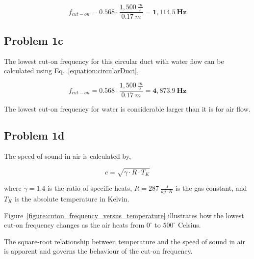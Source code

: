 \vspace{-0.25cm}
\begin{equation*}
    f_{cut-on} = 0.568 \cdot \frac{ 1,500~\frac{m}{s} }{ 0.17~m } = \boldsymbol{1,114.5~Hz}
\end{equation*}




\vspace{-0.25cm}
\subsection*{Problem 1c}

The lowest cut-on frequency for this circular duct with water flow can be calculated using Eq.~\ref{equation:circularDuct},

\vspace{-0.25cm}
\begin{equation*}
    f_{cut-on} = 0.568 \cdot \frac{ 1,500~\frac{m}{s} }{ 0.17~m } = \boldsymbol{4,873.9~Hz}
\end{equation*}

The lowest cut-on frequency for water is considerable larger than it is for air flow.





\vspace{-0.25cm}
\subsection*{Problem 1d}

The speed of sound in air is calculated by,

\vspace{-0.25cm}
\begin{equation}
    c = \sqrt{ \gamma \cdot R \cdot T_K }
    \label{equation:speedOfSoundInAir}
\end{equation}

where $\gamma = 1.4$ is the ratio of specific heats, $R = 287~\frac{J}{kg \cdot K}$ is the gas constant, and $T_K$ is the absolute temperature in Kelvin.

\vspace{0.25cm}
Figure~\ref{figure:cuton_frequency_versus_temperature} illustrates how the lowest cut-on frequency changes as the air heats from $0^{\circ}$ to $500^{\circ}$ Celsius.

\vspace{0.25cm}
The square-root relationship between temperature and the speed of sound in air is apparent and governs the behaviour of the cut-on frequency.




